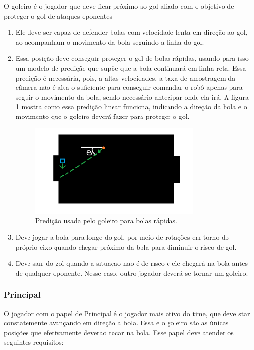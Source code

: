 \documentclass[a4paper,12pt]{article}
\begin{document}
O goleiro é o jogador que deve ficar próximo ao gol aliado com o objetivo de proteger o gol de ataques oponentes. 
\begin{enumerate}
\item Ele deve ser capaz de defender bolas com velocidade lenta em direção ao gol, ao acompanham o movimento da bola seguindo a linha do gol. 
\item Essa posição deve conseguir proteger o gol de bolas rápidas, usando para isso um modelo de predição que supõe que a bola continuará em linha reta. Essa predição é necessária, pois, a altas velocidades, a taxa de amostragem da câmera não é alta o suficiente para conseguir comandar o robô apenas para seguir o movimento da bola, sendo necessário antecipar onde ela irá. A figura \ref{fig:goal_predict} mostra como essa predição linear funciona, indicando a direção da bola e o movimento que o goleiro deverá fazer para proteger o gol.

\begin{figure}[H]
	\centering
	\includegraphics[width=0.8\textwidth]{figures/GoalierPredict.png}
   	\caption{Predição usada pelo goleiro para bolas rápidas.} \label{fig:goal_predict}
\end{figure}


\item Deve jogar a bola para longe do gol, por meio de rotações em torno do próprio eixo quando chegar próximo da bola para diminuir o risco de gol.
\item Deve sair do gol quando a situação não é de risco e ele chegará na bola antes de qualquer oponente. Nesse caso, outro jogador deverá se tornar um goleiro.
\end{enumerate}

\subsubsection{Principal} 

O jogador com o papel de Principal é o jogador mais ativo do time, que deve star constatemente avançando em direção a bola. Essa e o goleiro são as únicas posições que efetivamente deverao tocar na bola. Esse papel deve atender os seguintes requisitos:
\end{document}
